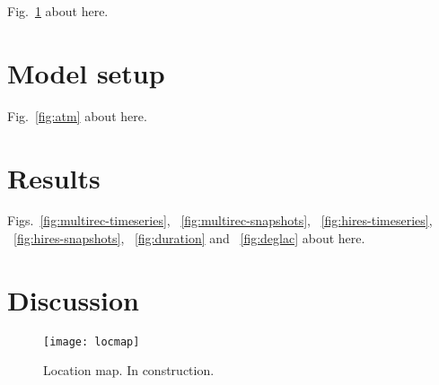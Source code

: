 \documentclass[tc, ms]{copernicus}
\begin{document}
\introduction
\label{sec:intro}

Fig.~\ref{fig:locmap} about here.

\section{Model setup}
\label{sec:model}

Fig.~\ref{fig:atm} about here.

\section{Results}
\label{sec:results}

Figs.~\ref{fig:multirec-timeseries}, ~\ref{fig:multirec-snapshots},
~\ref{fig:hires-timeseries}, ~\ref{fig:hires-snapshots},
~\ref{fig:duration} and ~\ref{fig:deglac} about here.

\section{Discussion}
\label{sec:discussion}


\conclusions
\label{sec:concl}


%


\begin{figure}
  \texttt{[image: locmap]}
  \caption{Location map. In construction.}
  \label{fig:locmap}
\end{figure}
\end{document}
